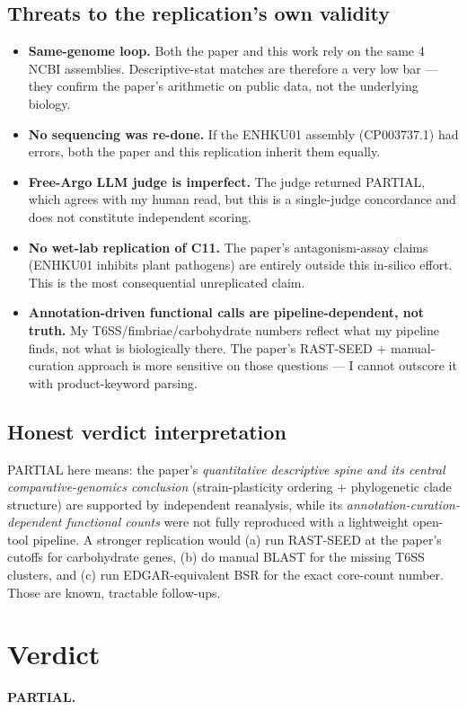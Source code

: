 \documentclass[11pt,letterpaper]{article}
\begin{document}
\subsection*{Threats to the replication's own validity}
\begin{itemize}[leftmargin=*]
    \item \textbf{Same-genome loop.} Both the paper and this work rely on the same 4 NCBI assemblies. Descriptive-stat matches are therefore a very low bar --- they confirm the paper's arithmetic on public data, not the underlying biology.
    \item \textbf{No sequencing was re-done.} If the ENHKU01 assembly (CP003737.1) had errors, both the paper and this replication inherit them equally.
    \item \textbf{Free-Argo LLM judge is imperfect.} The judge returned PARTIAL, which agrees with my human read, but this is a single-judge concordance and does not constitute independent scoring.
    \item \textbf{No wet-lab replication of C11.} The paper's antagonism-assay claims (ENHKU01 inhibits plant pathogens) are entirely outside this in-silico effort. This is the most consequential unreplicated claim.
    \item \textbf{Annotation-driven functional calls are pipeline-dependent, not truth.} My T6SS/fimbriae/carbohydrate numbers reflect what my pipeline finds, not what is biologically there. The paper's RAST-SEED + manual-curation approach is more sensitive on those questions --- I cannot outscore it with product-keyword parsing.
\end{itemize}

\subsection*{Honest verdict interpretation}
PARTIAL here means: the paper's \emph{quantitative descriptive spine and its central comparative-genomics conclusion} (strain-plasticity ordering + phylogenetic clade structure) are supported by independent reanalysis, while its \emph{annotation-curation-dependent functional counts} were not fully reproduced with a lightweight open-tool pipeline. A stronger replication would (a) run RAST-SEED at the paper's cutoffs for carbohydrate genes, (b) do manual BLAST for the missing T6SS clusters, and (c) run EDGAR-equivalent BSR for the exact core-count number. Those are known, tractable follow-ups.

\section*{Verdict}
\textbf{PARTIAL.}
\end{document}
